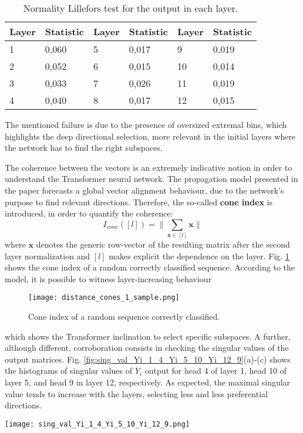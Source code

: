 \documentclass[11pt,a4paper,reqno]{amsart} %
\theoremstyle{definition}
\numberwithin{equation}{section}          %
\begin{document}
\begin{table}[H]
    \centering
    \caption{Normality Lillefors test for the output in each layer.}
    \begin{tabular}{|l|l||l|l||l|l|}
    \hline
    Layer & Statistic &Layer & Statistic & Layer & Statistic\\
    \hline
    1 & 0,060 & 5 & 0,017 & 9 & 0,019 \\
    \hline
    2 & 0,052 & 6 & 0,015 & 10 & 0,014\\
    \hline
    3 & 0,033 & 7 &0,026 & 11 & 0,019 \\
    \hline
    4 & 0,040 & 8 &0,017 & 12 & 0,015 \\
    \hline
    \end{tabular}
    \label{tab:lillefors}
\end{table}

\noindent The mentioned failure is due to the presence of oversized extremal bins, which highlights the deep directional selection, more relevant in the initial layers where the network has to find the right subspaces.

\par

The coherence between the vectors is an extremely indicative notion in order to understand the Transformer neural network. The propagation model presented in the paper forecasts a global vector alignment behaviour, due to the network's purpose to find relevant directions. Therefore, the  so-called \textbf{cone index} is introduced, in order to quantify the coherence:
\begin{equation}
I_{cone}([l])=\| \sum_{\mathbf{x} \in [l]} \mathbf{x} \|
\end{equation}
where $\mathbf{x}$ denotes the generic row-vector of the resulting matrix after the second layer normalization and $[l]$ makes explicit the dependence on the layer. Fig. \ref{fig:con_ind} shows the cone index of a random correctly classified sequence. According to the model, it is possible to witness layer-increasing behaviour
\begin{figure}[h!]
\centering
{\texttt{[image: distance\_cones\_1\_sample.png]}}
\caption{Cone index of a random sequence correctly classified.}
\label{fig:con_ind}
\end{figure}
which shows the Transformer inclination to select specific subspaces. A further, although different, corroboration consists in checking the singular values of the output matrices. Fig. \ref{fig:sing_val_Yi_1_4_Yi_5_10_Yi_12_9}(a)-(c) shows the histograms of singular values of $Y_i$ output for head 4 of layer 1, head 10 of layer 5, and head 9 in layer 12, respectively. As expected, the maximal singular value tends to increase with the layers, selecting less and less preferential directions.
\begin{figure*}[h!]
    \centering
    {\texttt{[image: sing\_val\_Yi\_1\_4\_Yi\_5\_10\_Yi\_12\_9.png]}}
    \caption{Histograms of singular values of $Y_i$ output for head 4 of layer 1 (a), head 10 of layer 5 (b), and head 9 in layer 12 (c).}
    \label{fig:sing_val_Yi_1_4_Yi_5_10_Yi_12_9}
\end{figure*}
\end{document}
